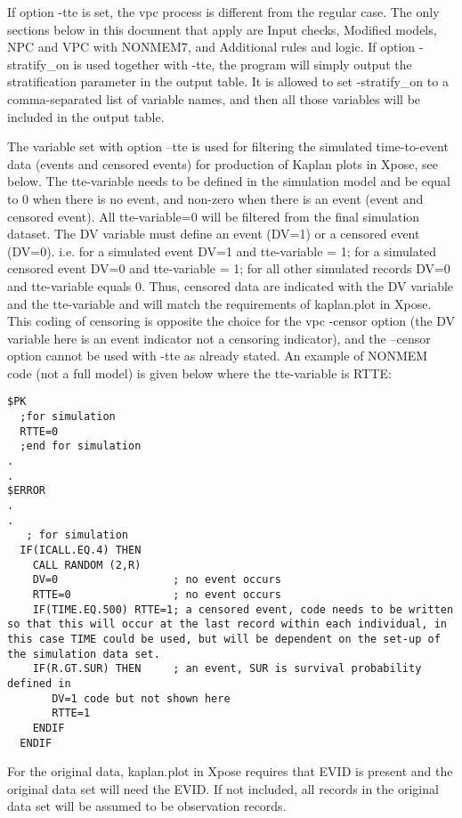 If option -tte is set, the vpc process is different from the regular case. The only sections below in this document that apply are Input checks, Modified models, NPC and VPC with NONMEM7, and Additional rules and logic. If option -stratify\_on is used together with -tte, the program will simply output the stratification parameter in the output table. It is allowed to set -stratify\_on to a comma-separated list of variable names, and then all those variables will be included in the output table.  

The variable set with option –tte is used for filtering the simulated time-to-event data (events and censored events) for production of Kaplan plots in Xpose, see below. The tte-variable needs to be defined in the simulation model and be equal to 0 when there is no event, and non-zero when there is an event (event and censored event). All tte-variable=0 will be filtered from the final simulation dataset. The DV variable must define an event (DV=1) or a censored event (DV=0).  i.e. for a simulated event DV=1 and tte-variable = 1; for a simulated censored event DV=0 and tte-variable = 1; for all other simulated records DV=0 and tte-variable equals 0. Thus, censored data are indicated with the DV variable and the tte-variable and will match the requirements of kaplan.plot in Xpose. This coding of censoring is opposite the choice for the vpc -censor option (the DV variable here is an event indicator not a censoring indicator), and the –censor option cannot be used with -tte as already stated. An example of NONMEM code (not a full model) is given below where the tte-variable is RTTE:

\begin{verbatim}
$PK
  ;for simulation
  RTTE=0
  ;end for simulation
.
.
$ERROR
.
.
   ; for simulation 
  IF(ICALL.EQ.4) THEN
    CALL RANDOM (2,R)
    DV=0                  ;	no event occurs
    RTTE=0                ;	no event occurs 
    IF(TIME.EQ.500) RTTE=1; a censored event, code needs to be written so that this will occur at the last record within each individual, in this case TIME could be used, but will be dependent on the set-up of the simulation data set.
    IF(R.GT.SUR) THEN     ; an event, SUR is survival probability defined in
       DV=1	code but not shown here
       RTTE=1
    ENDIF
  ENDIF
\end{verbatim}


For the original data, kaplan.plot in Xpose requires that EVID is present and the original data set will need the EVID. If not included, all records in the original data set will be assumed to be observation records.

